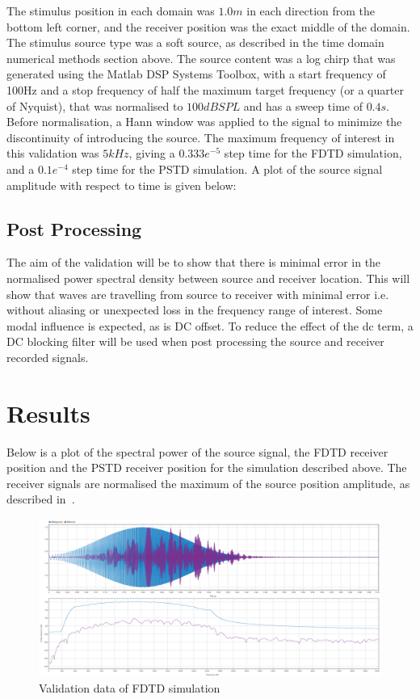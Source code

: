 The stimulus position in each domain was $1.0m$ in each direction from the bottom left corner, and the receiver position was the exact middle of the domain. The stimulus source type was a soft source, as described in the time domain numerical methods section above. The source content was a log chirp that was generated using the Matlab DSP Systems Toolbox, with a start frequency of 100Hz and a stop frequency of half the maximum target frequency (or a quarter of Nyquist), that was normalised to $100dBSPL$ and has a sweep time of $0.4s$. Before normalisation, a Hann window was applied to the signal to minimize the discontinuity of introducing the source. The maximum frequency of interest in this validation was $5kHz$, giving a $0.333e^{-5}$ step time for the FDTD simulation, and a $0.1e^{-4}$ step time for the PSTD simulation. A plot of the source signal amplitude with respect to time is given below:\\

\subsection{Post Processing}
The aim of the validation will be to show that there is minimal error in the normalised power spectral density between source and receiver location. This will show that waves are travelling from source to receiver with minimal error i.e. without aliasing or unexpected loss in the frequency range of interest. Some modal influence is expected, as is DC offset. To reduce the effect of the dc term, a DC blocking filter will be used when post processing the source and receiver recorded signals.

\section{Results}
Below is a plot of the spectral power of the source signal, the FDTD receiver position and the PSTD receiver position for the simulation described above. The receiver signals are normalised the maximum of the source position amplitude, as described in~\cite{Murphy2014}.\\ 

\begin{figure}[H]
\centering
  \includegraphics[width=\textwidth]{./graphics/fdtdvalidation.png}
  \caption{Validation data of FDTD simulation}
\end{figure}

